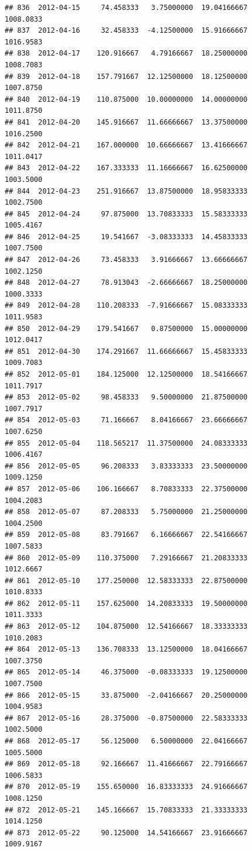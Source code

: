 \documentclass[
]{article}
\begin{document}
\begin{verbatim}
## 836  2012-04-15     74.458333   3.75000000  19.04166667    1008.0833
## 837  2012-04-16     32.458333  -4.12500000  15.91666667    1016.9583
## 838  2012-04-17    120.916667   4.79166667  18.25000000    1008.7083
## 839  2012-04-18    157.791667  12.12500000  18.12500000    1007.8750
## 840  2012-04-19    110.875000  10.00000000  14.00000000    1011.8750
## 841  2012-04-20    145.916667  11.66666667  13.37500000    1016.2500
## 842  2012-04-21    167.000000  10.66666667  13.41666667    1011.0417
## 843  2012-04-22    167.333333  11.16666667  16.62500000    1003.5000
## 844  2012-04-23    251.916667  13.87500000  18.95833333    1002.7500
## 845  2012-04-24     97.875000  13.70833333  15.58333333    1005.4167
## 846  2012-04-25     19.541667  -3.08333333  14.45833333    1007.7500
## 847  2012-04-26     73.458333   3.91666667  13.66666667    1002.1250
## 848  2012-04-27     78.913043  -2.66666667  18.25000000    1000.3333
## 849  2012-04-28    110.208333  -7.91666667  15.08333333    1011.9583
## 850  2012-04-29    179.541667   0.87500000  15.00000000    1012.0417
## 851  2012-04-30    174.291667  11.66666667  15.45833333    1009.7083
## 852  2012-05-01    184.125000  12.12500000  18.54166667    1011.7917
## 853  2012-05-02     98.458333   9.50000000  21.87500000    1007.7917
## 854  2012-05-03     71.166667   8.04166667  23.66666667    1007.6250
## 855  2012-05-04    118.565217  11.37500000  24.08333333    1006.4167
## 856  2012-05-05     96.208333   3.83333333  23.50000000    1009.1250
## 857  2012-05-06    106.166667   8.70833333  22.37500000    1004.2083
## 858  2012-05-07     87.208333   5.75000000  21.25000000    1004.2500
## 859  2012-05-08     83.791667   6.16666667  22.54166667    1007.5833
## 860  2012-05-09    110.375000   7.29166667  21.20833333    1012.6667
## 861  2012-05-10    177.250000  12.58333333  22.87500000    1010.8333
## 862  2012-05-11    157.625000  14.20833333  19.50000000    1011.3333
## 863  2012-05-12    104.875000  12.54166667  18.33333333    1010.2083
## 864  2012-05-13    136.708333  13.12500000  18.04166667    1007.3750
## 865  2012-05-14     46.375000  -0.08333333  19.12500000    1007.7500
## 866  2012-05-15     33.875000  -2.04166667  20.25000000    1004.9583
## 867  2012-05-16     28.375000  -0.87500000  22.58333333    1002.5000
## 868  2012-05-17     56.125000   6.50000000  22.04166667    1005.5000
## 869  2012-05-18     92.166667  11.41666667  22.79166667    1006.5833
## 870  2012-05-19    155.650000  16.83333333  24.91666667    1008.1250
## 872  2012-05-21    145.166667  15.70833333  21.33333333    1014.1250
## 873  2012-05-22     90.125000  14.54166667  23.91666667    1009.9167

\end{verbatim}
\end{document}
